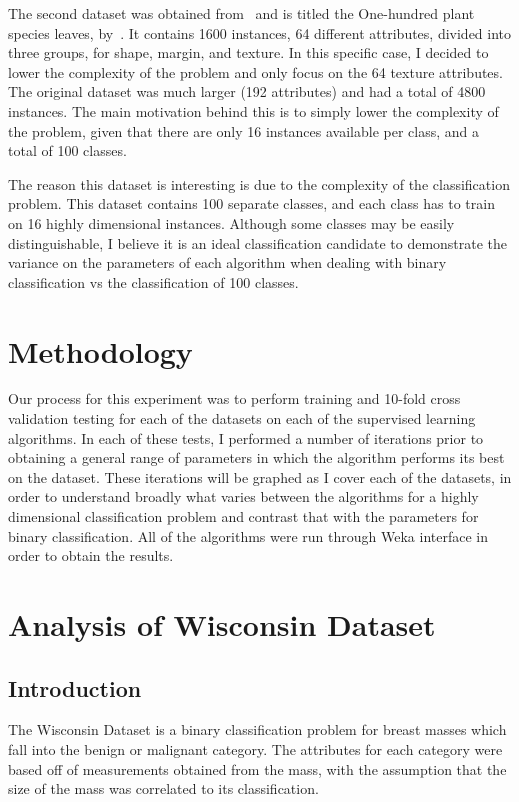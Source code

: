 \documentclass[annual]{acmsiggraph}
\begin{document}
The second dataset was obtained from~\cite{Frank+Asuncion:2010} and is titled the 
One-hundred plant species leaves, by~\cite{Mallah:2013}. It contains 1600 instances, 64 different 
attributes, divided into three groups, for shape, margin, and texture. 
In this specific case, I decided to lower the complexity of the problem 
and only focus on the 64 texture attributes. The original dataset was much larger 
(192 attributes) and had a total of 4800 instances. The main motivation behind this
is to simply lower the complexity of the problem, given that there are only 16
instances available per class, and a total of 100 classes.

The reason this dataset is interesting is due to the complexity of the classification
problem. This dataset contains 100 separate classes, and each class has to train on
16 highly dimensional instances. Although some classes may be easily distinguishable,
I believe it is an ideal classification candidate to demonstrate the variance on the
parameters of each algorithm when dealing with binary classification vs the classification
of 100 classes.

\section{Methodology}

Our process for this experiment was to perform training and 10-fold cross validation
testing for each of the datasets on each of the supervised learning algorithms. In
each of these tests, I performed a number of iterations prior to obtaining a general
range of parameters in which the algorithm performs its best on the dataset. These
iterations will be graphed as I cover each of the datasets, in order to understand
broadly what varies between the algorithms for a highly dimensional classification
problem and contrast that with the parameters for binary classification. All of the
algorithms were run through Weka interface in order to obtain the results.

\section{Analysis of Wisconsin Dataset}

\subsection{Introduction}

The Wisconsin Dataset is a binary classification problem for breast masses which fall
into the benign or malignant category. The attributes for each category were based off
of measurements obtained from the mass, with the assumption that the size of the mass
was correlated to its classification.
\end{document}
